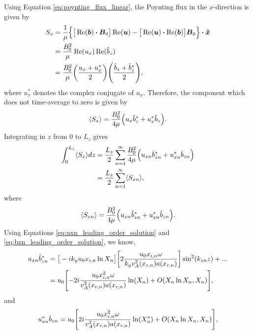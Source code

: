 Using Equation \eqref{eq:poynting_flux_linear}, the Poynting flux in the $x$-direction is given by
\begin{equation}
\begin{aligned}
    S_x &= \frac{1}{\mu}\Big\{\big[\Re(\vec{b})\vdot\vec{B}_0\big]\Re(\vec{u}) - \big[\Re(\vec{u})\vdot\Re(\vec{b})\big]\vec{B}_0\Big\}\vdot\vec{\hat{x}} \\
    &= \frac{B_0^2}{\mu}\Re(u_x)\Re(\hat{b}_z) \\
    &= \frac{B_0^2}{\mu}\qty(\frac{u_x + u_x^*}{2})\qty(\frac{\hat{b}_z+\hat{b}_z^*}{2}),
\end{aligned}
\end{equation}
where $u_x^*$ denotes the complex conjugate of $u_x$. Therefore, the component which does not time-average to zero is given by
\begin{equation}
    \label{eq:chap_4_avg_poy_flux}
    \langle S_x \rangle = \frac{B_0^2}{4\mu}\qty(u_x\hat{b}_z^* + u_x^*\hat{b}_z).
\end{equation}
Integrating in $z$ from $0$ to $L_z$ gives
\begin{equation}
    \begin{aligned}
    \int_0^{L_z}\langle S_x \rangle dz &= \frac{L_z}{2}\sum_{n=1}^\infty\frac{B_0^2}{4\mu}\qty(u_{xn}\hat{b}_{zn}^* + u_{xn}^*\hat{b}_{zn}) \\
    &= \frac{L_z}{2}\sum_{n=1}^\infty \langle S_{xn} \rangle,
    \end{aligned}
\end{equation}
where 
\begin{equation}
    \label{eq:chap_4_avg_poy_flux_nth_contribution}
    \langle S_{xn} \rangle = \frac{B_0^2}{4\mu}\qty(u_{xn}\hat{b}_{zn}^* + u_{xn}^*\hat{b}_{zn}).
\end{equation}
Using Equations \eqref{eq:uxn_leading_order_solution} and \eqref{eq:bzn_leading_order_solution}, we know,
\begin{equation}
    \begin{aligned}
    u_{xn}\hat{b}_{zn}^* &= \big[-ik_y u_0x_{i,n}\ln X_n\big]\qty[2\frac{u_0x_{i,n}\omega}{k_yv_{A}^2(x_{r,n})a(x_{r,n})}]\sin^2(k_{zn}z) + ... \\
    &= u_0\qty[-2i\frac{u_0x_{i,n}^2\omega}{v_{A}^2(x_{r,n})a(x_{r,n})}\ln(X_n) + O\qty(X_n\ln X_n, X_n)],
    \end{aligned}
\end{equation}
and
\begin{equation}
    u_{xn}^*\hat{b}_{zn} = u_0\qty[2i\frac{u_0x_{i,n}^2\omega}{v_{A}^2(x_{r,n})a(x_{r,n})}\ln(X_n^*) + O\qty(X_n\ln X_n, X_n)],
\end{equation}
